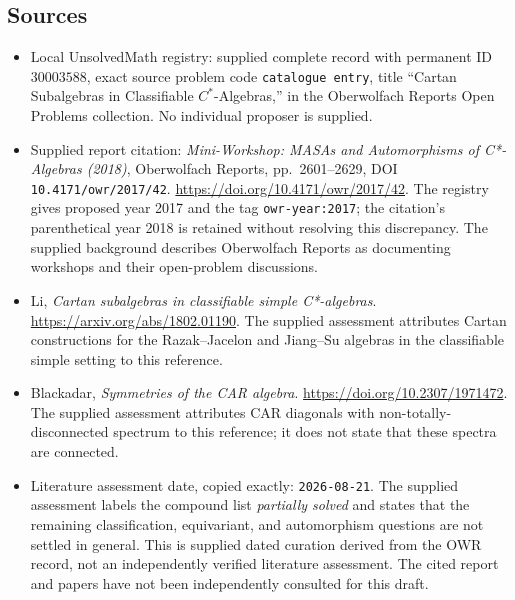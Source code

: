 \documentclass[11pt]{article}
\begin{document}
\subsection{Sources}
\begin{itemize}
\item Local UnsolvedMath registry: supplied complete record with permanent ID \(30003588\), exact source problem code \texttt{catalogue entry}, title ``Cartan Subalgebras in Classifiable \(C^*\)-Algebras,'' in the Oberwolfach Reports Open Problems collection. No individual proposer is supplied.
\item Supplied report citation: \emph{Mini-Workshop: MASAs and Automorphisms of C*-Algebras (2018)}, Oberwolfach Reports, pp.\ 2601--2629, DOI \texttt{10.4171/owr/2017/42}. \url{https://doi.org/10.4171/owr/2017/42}. The registry gives proposed year 2017 and the tag \texttt{owr-year:2017}; the citation's parenthetical year 2018 is retained without resolving this discrepancy. The supplied background describes Oberwolfach Reports as documenting workshops and their open-problem discussions.
\item Li, \emph{Cartan subalgebras in classifiable simple C*-algebras}. \url{https://arxiv.org/abs/1802.01190}. The supplied assessment attributes Cartan constructions for the Razak--Jacelon and Jiang--Su algebras in the classifiable simple setting to this reference.
\item Blackadar, \emph{Symmetries of the CAR algebra}. \url{https://doi.org/10.2307/1971472}. The supplied assessment attributes CAR diagonals with non-totally-disconnected spectrum to this reference; it does not state that these spectra are connected.
\item Literature assessment date, copied exactly: \texttt{2026-08-21}. The supplied assessment labels the compound list \emph{partially solved} and states that the remaining classification, equivariant, and automorphism questions are not settled in general. This is supplied dated curation derived from the OWR record, not an independently verified literature assessment. The cited report and papers have not been independently consulted for this draft.
\end{itemize}
\end{document}
